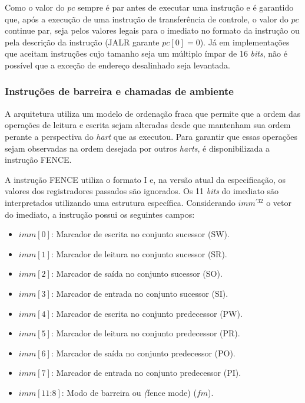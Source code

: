   Como o valor do $pc$ sempre é par antes de executar uma instrução e é garantido que, após a execução 
  de uma instrução de transferência de controle, o valor do $pc$ continue par, 
  seja pelos valores legais para o imediato no formato da 
  instrução ou pela descrição da instrução (JALR garante $pc[0] = 0$). Já em implementações que aceitam 
  instruções cujo tamanho seja um múltiplo ímpar de 16 \emph{bits}, não é possível que a exceção de 
  endereço desalinhado seja levantada.

\subsubsection{Instruções de barreira e chamadas de ambiente}
\label{ssec:fs32}

  A arquitetura utiliza um modelo de ordenação fraca que permite que a ordem das operações de leitura e escrita
  sejam alteradas desde que mantenham sua ordem perante a perspectiva do \emph{hart} que as executou.
  Para garantir que essas operações sejam observadas na ordem desejada por outros \emph{harts},
  é disponibilizada a instrução FENCE.

  A instrução FENCE utiliza o formato I e, na versão atual da especificação,
  os valores dos registradores passados são ignorados.
  Os 11 \emph{bits} do imediato são interpretados utilizando uma estrutura específica. 
  Considerando $imm^{'32}$ o vetor do imediato, a instrução possui os seguintes campos:

  \begin{itemize}
    \item $imm[0]$: Marcador de escrita no conjunto sucessor (SW).
    \item $imm[1]$: Marcador de leitura no conjunto sucessor (SR).
    \item $imm[2]$: Marcador de saída no conjunto sucessor (SO).
    \item $imm[3]$: Marcador de entrada no conjunto sucessor (SI).
    \item $imm[4]$: Marcador de escrita no conjunto predecessor (PW).
    \item $imm[5]$: Marcador de leitura no conjunto predecessor (PR).
    \item $imm[6]$: Marcador de saída no conjunto predecessor (PO).
    \item $imm[7]$: Marcador de entrada no conjunto predecessor (PI).
    \item $imm[11\text{:}8]$: Modo de barreira ou \emph(fence mode) ($f\!m$).
  \end{itemize}

